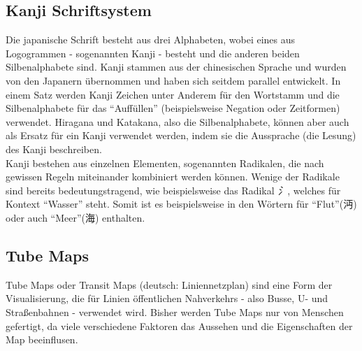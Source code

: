 \subsection{Kanji Schriftsystem}
Die japanische Schrift besteht aus drei Alphabeten, wobei eines aus Logogrammen - sogenannten Kanji - besteht und die anderen beiden Silbenalphabete sind. Kanji stammen aus der chinesischen Sprache und wurden von den Japanern übernommen und haben sich seitdem parallel entwickelt. In einem Satz werden Kanji Zeichen unter Anderem für den Wortstamm und die Silbenalphabete für das "`Auffüllen"' (beispielsweise Negation oder Zeitformen) verwendet. Hiragana und Katakana, also die Silbenalphabete, können aber auch als Ersatz für ein Kanji verwendet werden, indem sie die Aussprache (die Lesung) des Kanji beschreiben. \\
Kanji bestehen aus einzelnen Elementen, sogenannten Radikalen, die nach gewissen Regeln miteinander kombiniert werden können. Wenige der Radikale sind bereits bedeutungstragend, wie beispielsweise das Radikal \emph{氵}, welches für Kontext "`Wasser"' steht. Somit ist es beispielsweise in den Wörtern für "`Flut"'(沔) oder auch "`Meer"'(海) enthalten. 

\subsection{Tube Maps}
Tube Maps oder Transit Maps (deutsch: Liniennetzplan) sind eine Form der Visualisierung, die für Linien öffentlichen Nahverkehrs - also Busse, U- und Straßenbahnen - verwendet wird. Bisher werden Tube Maps nur von Menschen gefertigt, da viele verschiedene Faktoren das Aussehen und die Eigenschaften der Map beeinflusen.  

